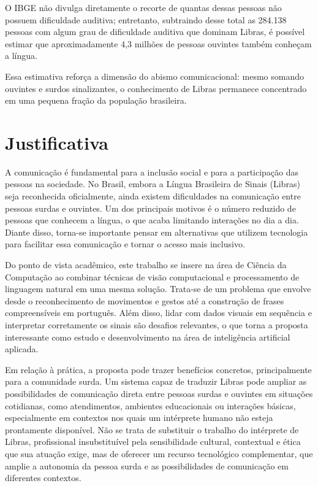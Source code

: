 \documentclass[
    12pt,                %
    openright,           %
    oneside,             %
    a4paper,             %
    english,             %
    brazil               %
]{abntex2}
\begin{document}
O IBGE não divulga diretamente o recorte de quantas dessas pessoas não possuem dificuldade auditiva; entretanto, subtraindo desse total as 284.138 pessoas com algum grau de dificuldade auditiva que dominam Libras, é possível estimar que aproximadamente 4,3 milhões de pessoas ouvintes também conheçam a língua. 

Essa estimativa reforça a dimensão do abismo comunicacional: mesmo somando ouvintes e surdos sinalizantes, o conhecimento de Libras permanece concentrado em uma pequena fração da população brasileira.


\section{Justificativa}
\label{sec:justificativa}

A comunicação é fundamental para a inclusão social e para a participação das pessoas na sociedade. No Brasil, embora a Língua Brasileira de Sinais (Libras) seja reconhecida oficialmente, ainda existem dificuldades na comunicação entre pessoas surdas e ouvintes. Um dos principais motivos é o número reduzido de pessoas que conhecem a língua, o que acaba limitando interações no dia a dia. Diante disso, torna-se importante pensar em alternativas que utilizem tecnologia para facilitar essa comunicação e tornar o acesso mais inclusivo.

Do ponto de vista acadêmico, este trabalho se insere na área de Ciência da Computação ao combinar técnicas de visão computacional e processamento de linguagem natural em uma mesma solução. Trata-se de um problema que envolve desde o reconhecimento de movimentos e gestos até a construção de frases compreensíveis em português. Além disso, lidar com dados visuais em sequência e interpretar corretamente os sinais são desafios relevantes, o que torna a proposta interessante como estudo e desenvolvimento na área de inteligência artificial aplicada.

Em relação à prática, a proposta pode trazer benefícios concretos, principalmente para a comunidade surda. Um sistema capaz de traduzir Libras pode ampliar as possibilidades de comunicação direta entre pessoas surdas e ouvintes em situações cotidianas, como atendimentos, ambientes educacionais ou interações básicas, especialmente em contextos nos quais um intérprete humano não esteja prontamente disponível. Não se trata de substituir o trabalho do intérprete de Libras, profissional insubstituível pela sensibilidade cultural, contextual e ética que sua atuação exige, mas de oferecer um recurso tecnológico complementar, que amplie a autonomia da pessoa surda e as possibilidades de comunicação em diferentes contextos.
\end{document}
